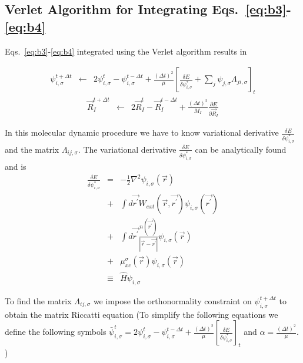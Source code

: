 \subsection{Verlet Algorithm for Integrating Eqs.~\ref{eq:b3}-\ref{eq:b4}}

Eqs.~\ref{eq:b3}-\ref{eq:b4} integrated using the Verlet algorithm
results in

\begin{eqnarray}
\psi_{i,\sigma}^{t+ \Delta t} 
                   &\leftarrow& 
                    2 \psi_{i,\sigma}^{t} - \psi_{i,\sigma}^{t-\Delta t}
                      + \frac{(\Delta t)^2}{\mu}
                        \left[ 
                           \frac{\delta E}{\delta \psi_{i,\sigma}^{*}}
                            + \sum_{j} \psi_{j,\sigma} \Lambda_{ji,\sigma} 
                        \right]_{t}
\label{eq:b6}
\end{eqnarray}
\begin{eqnarray}
\vec{R}_I^{t+\Delta t} &\leftarrow& 
                    2 \vec{R}_I^{t} - \vec{R}_I^{t-\Delta t}
                    + \frac{(\Delta t)^2}{M_I} 
                       \frac{\partial E}{\partial \vec{R}_I}
\label{eq:b7}
\end{eqnarray}
               
In this molecular dynamic procedure we have to know variational derivative
$\frac{\delta E}{\delta \psi_{i,\sigma}^{*}}$ and the matrix 
$\Lambda_{ij,\sigma}$. 
The variational derivative $\frac{\delta E}{\delta \psi_{i,\sigma}^{*}}$ 
can be analytically found and is
\begin{eqnarray}
\frac{\delta E}{\delta \psi_{i,\sigma}^{*}} 
      &=&  -\frac{1}{2} \nabla^2 
            \psi_{i,\sigma}(\vec{r}) \nonumber \\
      &+& \int d\vec{r^{\prime}} 
           W_{ext}(\vec{r},\vec{r^{\prime}}) 
          \psi_{i,\sigma}(\vec{r^{\prime}}) \nonumber \\
      &+& \int d\vec{r^{\prime}} 
                    \frac{n(\vec{r^{\prime}})}{|\vec{r}-\vec{r^{\prime}}|}
          \psi_{i,\sigma}(\vec{r}) \nonumber \\
      &+& \mu_{xc}^{\sigma}(\vec{r}) 
          \psi_{i,\sigma}(\vec{r}) \nonumber \\
& \equiv & \hat{H} \psi_{i,\sigma}
\label{eq:b8}
\end{eqnarray}
                        
\noindent
To find the matrix $\Lambda_{ij,\sigma}$ we impose the orthonormality
constraint on $\psi_{i,\sigma}^{t+\Delta t}$ to obtain the
matrix Riccatti equation 
(To simplify the following equations we define the following symbols
$\bar{\psi}_{i,\sigma}^{t} = 2 \psi_{i,\sigma}^{t} -\psi_{i,\sigma}^{t-\Delta t}
              + \frac{(\Delta t)^2}{\mu}
                 \left[ \frac{\delta E}{\delta \psi_{i,\sigma}^{*}} \right]_{t}$
and $\alpha = \frac{(\Delta t)^2}{\mu}$.
)

